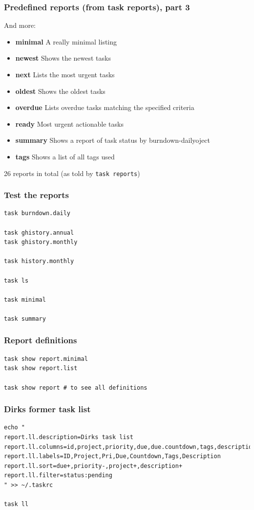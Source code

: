 \documentclass[t,handout]{beamer}
\begin{document}
\begin{frame}[fragile]\frametitle{Predefined reports (from task reports), part 3}
    And more:

    \begin{itemize}
        \item \textbf{minimal}          A really minimal listing
        \item \textbf{newest}           Shows the newest tasks
        \item \textbf{next}             Lists the most urgent tasks
        \item \textbf{oldest}           Shows the oldest tasks
        \item \textbf{overdue}          Lists overdue tasks matching the specified criteria
        \item \textbf{ready}            Most urgent actionable tasks
        \item \textbf{summary}          Shows a report of task status by burndown-dailyoject
        \item \textbf{tags}             Shows a list of all tags used
    \end{itemize}

    26 reports in total (as told by \verb=task reports=)
\end{frame}

\begin{frame}[fragile]\frametitle{Test the reports}
    \vfill
    \begin{lstlisting}
task burndown.daily

task ghistory.annual
task ghistory.monthly

task history.monthly

task ls

task minimal

task summary\end{lstlisting}
\end{frame}

\begin{frame}[fragile]\frametitle{Report definitions}
    \vfill
    \begin{lstlisting}
task show report.minimal
task show report.list

task show report # to see all definitions\end{lstlisting}
\end{frame}

\begin{frame}[fragile]\frametitle{Dirks former task list}
    \vfill
    \begin{lstlisting}
echo "
report.ll.description=Dirks task list
report.ll.columns=id,project,priority,due,due.countdown,tags,description
report.ll.labels=ID,Project,Pri,Due,Countdown,Tags,Description
report.ll.sort=due+,priority-,project+,description+
report.ll.filter=status:pending
" >> ~/.taskrc

task ll\end{lstlisting}
\end{frame}
\end{document}
